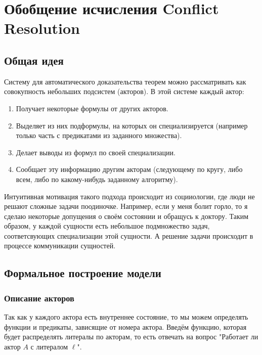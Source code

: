 \chapter{Обобщение исчисления Conflict Resolution}
\startrelatedwork
\label{sec:chap2}


\section{Общая идея}
Систему для автоматического доказательства теорем можно рассматривать как совокупность небольших подсистем (акторов). В этой системе каждый актор:
\begin{enumerate}
	\item Получает некоторые формулы от других акторов.
    \item Выделяет из них подформулы, на которых он специализируется (например только часть с предикатами из заданного множества).
    \item Делает выводы из формул по своей специализации.
    \item Сообщает эту информацию другим акторам (следующему по кругу, либо всем, либо по какому-нибудь заданному алгоритму).
\end{enumerate} \par
Интуитивная мотивация такого подхода происходит из социиологии, где люди не решают сложные задачи поодиночке. Например, если у меня болит горло, то я сделаю некоторые допущения о своём состоянии и обращусь к доктору. Таким образом, у каждой сущности есть небольшое подмножество задач, соответсвующих специализации этой сущности. А решение задачи происходит в процессе коммуникации сущностей.

\section{Формальное построение модели}

\subsection{Описание акторов}

Так как у каждого актора есть внутреннее состояние, то мы можем определять функции и предикаты, зависящие от номера актора. Введём функцию, которая будет распределять литералы по акторам, то есть отвечать на вопрос "Работает ли актор $A$ с литералом $\ell$".

